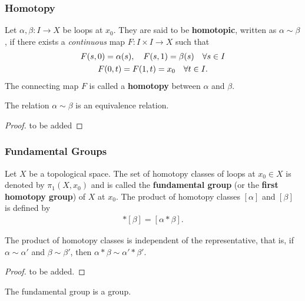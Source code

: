 \documentclass[10pt]{article}
\begin{document}
\subsubsection{Homotopy}
\begin{definition}[Homotopy]
    Let $\alpha,\beta:I\to X$ be loops at $x_0$.
    They are said to be \textbf{homotopic}, written as $\alpha\sim\beta$, if there exists a \textit{continuous} map $F:I\times I\to X$ such that
    \begin{gather}
        F(s,0)=\alpha(s),\quad F(s,1)=\beta(s)\quad \forall s\in I\notag\\
        F(0,t)=F(1,t)=x_0\quad\forall t\in I.\notag
    \end{gather}
    The connecting map $F$ is called a \textbf{homotopy} between $\alpha$ and $\beta$.
\end{definition}
\begin{proposition}
    The relation $\alpha\sim\beta$ is an equivalence relation.
\end{proposition}
\begin{proof}
    to be added
\end{proof}


\subsubsection{Fundamental Groups}
\begin{definition}
    Let $X$ be a topological space.
    The set of homotopy classes of loops at $x_0\in X$ is denoted by $\pi_1(X,x_0)$ and is called the \textbf{fundamental group} (or the \textbf{first homotopy group}) of $X$ at $x_0$.
    The product of homotopy classes $[\alpha]$ and $[\beta]$ is defined by
    \begin{align}
        [\alpha]* [\beta]=[\alpha*\beta].
    \end{align}
\end{definition}

\begin{lemma}
    The product of homotopy classes is independent of the representative, that is, if $\alpha\sim\alpha'$ and $\beta\sim\beta'$, then $\alpha*\beta\sim\alpha'*\beta'$.
\end{lemma}
\begin{proof}
    to be added.
\end{proof}

\begin{theorem}
    The fundamental group is a group.
\end{theorem}
\end{document}
